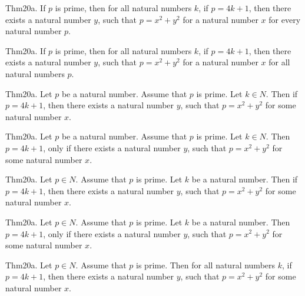 \documentclass{article}
\begin{document}
Thm20a. If $p$ is prime, then for all natural numbers $k$, if $p = 4 k + 1$, then there exists a natural number $y$, such that $p = x ^{ 2}+ y ^{ 2}$ for a natural number $x$ for every natural number $p$.

Thm20a. If $p$ is prime, then for all natural numbers $k$, if $p = 4 k + 1$, then there exists a natural number $y$, such that $p = x ^{ 2}+ y ^{ 2}$ for a natural number $x$ for all natural numbers $p$.

Thm20a. Let $p$ be a natural number. Assume that $p$ is prime. Let $k \in N$. Then if $p = 4 k + 1$, then there exists a natural number $y$, such that $p = x ^{ 2}+ y ^{ 2}$ for some natural number $x$.

Thm20a. Let $p$ be a natural number. Assume that $p$ is prime. Let $k \in N$. Then $p = 4 k + 1$, only if there exists a natural number $y$, such that $p = x ^{ 2}+ y ^{ 2}$ for some natural number $x$.

Thm20a. Let $p \in N$. Assume that $p$ is prime. Let $k$ be a natural number. Then if $p = 4 k + 1$, then there exists a natural number $y$, such that $p = x ^{ 2}+ y ^{ 2}$ for some natural number $x$.

Thm20a. Let $p \in N$. Assume that $p$ is prime. Let $k$ be a natural number. Then $p = 4 k + 1$, only if there exists a natural number $y$, such that $p = x ^{ 2}+ y ^{ 2}$ for some natural number $x$.

Thm20a. Let $p \in N$. Assume that $p$ is prime. Then for all natural numbers $k$, if $p = 4 k + 1$, then there exists a natural number $y$, such that $p = x ^{ 2}+ y ^{ 2}$ for some natural number $x$.
\end{document}

